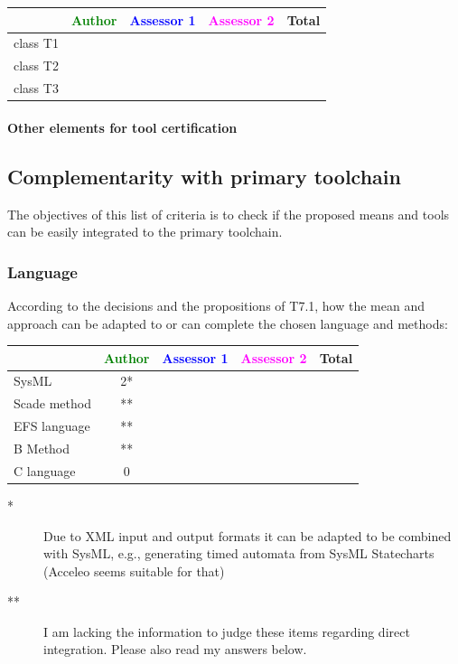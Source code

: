 \begin{tabular}{|l | c | c | c | c|}
\hline
& \textcolor{green}{Author} & \textcolor{blue}{Assessor 1} & \textcolor{magenta}{Assessor 2} & Total \\
\hline 
class T1 & & & &  \\
\hline
class T2   & & & & \\
\hline
class T3  & & & & \\
\hline
\end{tabular}

\paragraph{Other elements for tool certification}


\subsection{Complementarity with primary toolchain}

The objectives of this list of criteria is to check if the proposed means and tools can be easily integrated to the primary toolchain.

\subsubsection{Language}


According to the decisions and the propositions of T7.1, how the mean and approach can be adapted to or can complete the chosen language and methods:

\begin{tabular}{|l | c | c | c | c|}
\hline
& \textcolor{green}{Author} & \textcolor{blue}{Assessor 1} & \textcolor{magenta}{Assessor 2} & Total \\
\hline 
SysML  &2*& & & \\
\hline
Scade method &** & & & \\
\hline
EFS language &** & & & \\
\hline
B Method &** & & & \\
\hline
C language &0 & & & \\
\hline
\end{tabular}

\begin{author_comment}
\begin{description}
\item[*] Due to XML input and output formats it can be adapted to be combined with SysML, e.g., generating timed automata from SysML Statecharts (Acceleo seems suitable for that)
\item[**] I am lacking the information to judge these items regarding direct integration. Please also read my answers below.
\end{description}
\end{author_comment}

